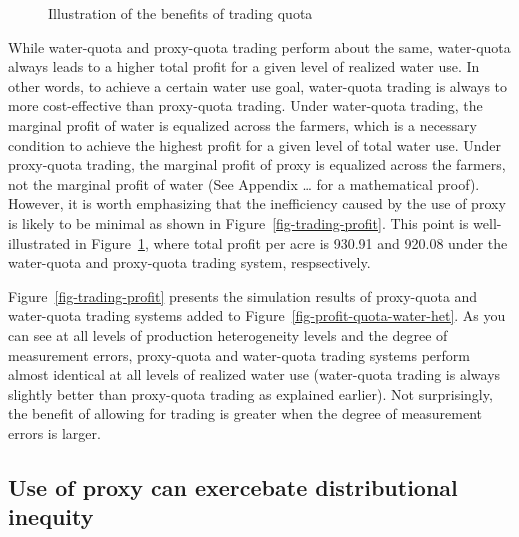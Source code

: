 \documentclass[
  letterpaper,
  DIV=11,
  numbers=noendperiod]{scrartcl}
\begin{document}
\begin{figure}[H]


\caption{\label{fig-trading-profit-illustration}Illustration of the
benefits of trading quota}

\end{figure}%

While water-quota and proxy-quota trading perform about the same,
water-quota always leads to a higher total profit for a given level of
realized water use. In other words, to achieve a certain water use goal,
water-quota trading is always to more cost-effective than proxy-quota
trading. Under water-quota trading, the marginal profit of water is
equalized across the farmers, which is a necessary condition to achieve
the highest profit for a given level of total water use. Under
proxy-quota trading, the marginal profit of proxy is equalized across
the farmers, not the marginal profit of water (See Appendix \ldots{} for
a mathematical proof). However, it is worth emphasizing that the
inefficiency caused by the use of proxy is likely to be minimal as shown
in Figure~\ref{fig-trading-profit}. This point is well-illustrated in
Figure~\ref{fig-trading-profit-illustration}, where total profit per
acre is 930.91 and 920.08 under the water-quota and proxy-quota trading
system, respsectively.

Figure~\ref{fig-trading-profit} presents the simulation results of
proxy-quota and water-quota trading systems added to
Figure~\ref{fig-profit-quota-water-het}. As you can see at all levels of
production heterogeneity levels and the degree of measurement errors,
proxy-quota and water-quota trading systems perform almost identical at
all levels of realized water use (water-quota trading is always slightly
better than proxy-quota trading as explained earlier). Not surprisingly,
the benefit of allowing for trading is greater when the degree of
measurement errors is larger.

\subsection{Use of proxy can exercebate distributional
inequity}\label{use-of-proxy-can-exercebate-distributional-inequity}
\end{document}
